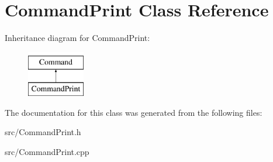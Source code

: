 \hypertarget{class_command_print}{
\section{\-Command\-Print \-Class \-Reference}
\label{class_command_print}
}
\-Inheritance diagram for \-Command\-Print\-:\begin{figure}[H]
\begin{center}
\leavevmode
\includegraphics[height=2.000000cm]{class_command_print}
\end{center}
\end{figure}


\-The documentation for this class was generated from the following files\-:\begin{DoxyCompactItemize}
\item 
src/\-Command\-Print.\-h\item 
src/\-Command\-Print.\-cpp\end{DoxyCompactItemize}
